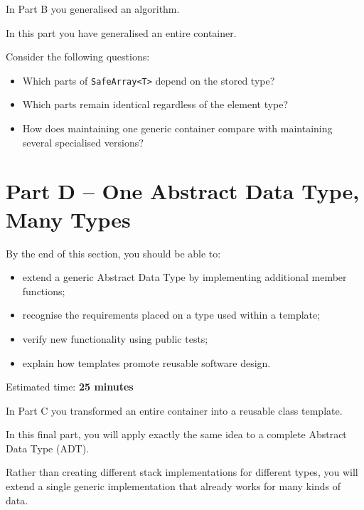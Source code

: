 \documentclass{csc2059practical}
\begin{document}
\begin{reflectionbox}
In Part B you generalised an algorithm.

In this part you have generalised an entire container.

Consider the following questions:

\begin{itemize}
    \item Which parts of \texttt{SafeArray<T>} depend on the stored type?
    \item Which parts remain identical regardless of the element type?
    \item How does maintaining one generic container compare with maintaining several specialised versions?
\end{itemize}
\end{reflectionbox}

\section{Part D -- One Abstract Data Type, Many Types}

\begin{learningoutcomes}
By the end of this section, you should be able to:
\begin{itemize}
    \item extend a generic Abstract Data Type by implementing additional member functions;
    \item recognise the requirements placed on a type used within a template;
    \item verify new functionality using public tests;
    \item explain how templates promote reusable software design.
\end{itemize}
\end{learningoutcomes}

\begin{infobox}
Estimated time: \textbf{25 minutes}
\end{infobox}

In Part C you transformed an entire container into a reusable class template.

In this final part, you will apply exactly the same idea to a complete Abstract Data Type (ADT).

Rather than creating different stack implementations for different types, you will extend a single generic implementation that already works for many kinds of data.
\end{document}
